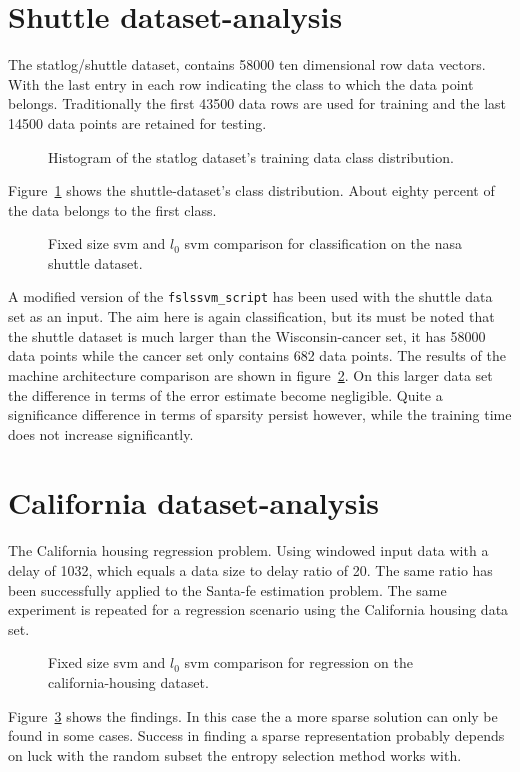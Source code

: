 \section{Shuttle dataset-analysis}
The statlog/shuttle dataset, contains 58000 ten dimensional row data vectors. With the last entry in each row indicating the class to which
the data point belongs. Traditionally the first 43500 data rows are used for training and the last 14500 data points are retained for testing.
\begin{figure}
\centering

\caption{Histogram of the statlog dataset's training data class distribution.}
\label{fig:histShuttle}
\end{figure}
Figure~\ref{fig:histShuttle} shows the shuttle-dataset's class distribution. About eighty percent of the data belongs to the first class. 
\begin{figure}
\centering



\caption{Fixed size svm and $l_0$ svm comparison for classification on the nasa shuttle dataset.}
\label{fig:shuttle}
\end{figure}
A modified version of the \texttt{fslssvm\_script} has been used with the shuttle data set as an input. The aim here is again classification, but its must be noted that the shuttle dataset is much larger than the Wisconsin-cancer set, it has 58000 data points while the cancer set only contains 682 data points. The results of the machine architecture comparison are shown in figure~\ref{fig:shuttle}. On this larger data set the difference in terms of the error estimate become negligible. Quite a significance difference in terms of sparsity persist however, while the training time does not increase significantly. 


\section{California dataset-analysis}
The California housing regression problem. Using windowed input data with a delay of 1032, which equals a data size to delay ratio of 20. The same ratio has been successfully applied to the Santa-fe estimation problem. The same experiment is repeated for a regression scenario using the California housing data set. 
\begin{figure}
\centering



\caption{Fixed size svm and $l_0$ svm comparison for regression on the california-housing dataset.}
\label{fig:california}
\end{figure}
Figure~\ref{fig:california} shows the findings. In this case the a more sparse solution can only be found in some cases. Success in finding a sparse representation probably depends on luck with the random subset the entropy selection method works with.
